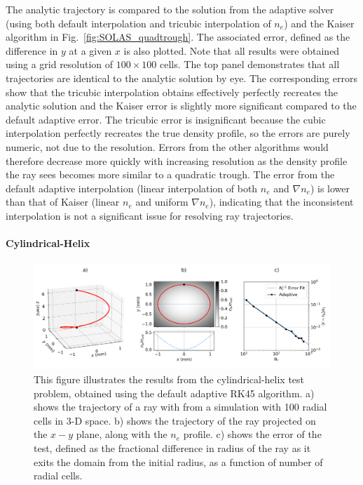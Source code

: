 The analytic trajectory is compared to the solution from the adaptive solver (using both default interpolation and tricubic interpolation of $n_e$) and the Kaiser algorithm in Fig.~\ref{fig:SOLAS_quadtrough}.
The associated error, defined as the difference in $y$ at a given $x$ is also plotted.
Note that all results were obtained using a grid resolution of $100\times100$ cells.
The top panel demonstrates that all trajectories are identical to the analytic solution by eye.
The corresponding errors show that the tricubic interpolation obtains effectively perfectly recreates the analytic solution and the Kaiser error is slightly more significant compared to the default adaptive error.
The tricubic error is insignificant because the cubic interpolation perfectly recreates the true density profile, so the errors are purely numeric, not due to the resolution.
Errors from the other algorithms would therefore decrease more quickly with increasing resolution as the density profile the ray sees becomes more similar to a quadratic trough.
The error from the default adaptive interpolation (linear interpolation of both $n_e$ and $\nabla n_e$) is lower than that of Kaiser (linear $n_e$ and uniform $\nabla n_e$), indicating that the inconsistent interpolation is not a significant issue for resolving ray trajectories.

\paragraph*{Cylindrical-Helix}

\begin{figure}[t!]
    \includegraphics[width=\linewidth]{Numerics/Images/cyl_helix.png}
    \centering
    \caption{This figure illustrates the results from the cylindrical-helix test problem, obtained using the default adaptive RK45 algorithm.
    a) shows the trajectory of a ray with from a simulation with 100 radial cells in 3-D space.
    b) shows the trajectory of the ray projected on the $x-y$ plane, along with the $n_e$ profile.
    c) shows the error of the test, defined as the fractional difference in radius of the ray as it exits the domain from the initial radius, as a function of number of radial cells.}%
    \label{fig:SOLAS_cylhelix}
\end{figure}

